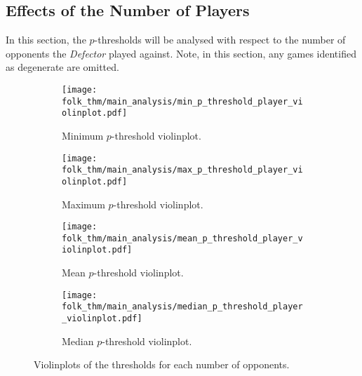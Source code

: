 \subsection{Effects of the Number of Players}\label{subsec:Effects_of_the_number_of_Players}
In this section, the \(p\)-thresholds will be analysed with respect to the
number of opponents the \textit{Defector} played against. Note, in this section,
any games identified as degenerate are omitted.


\begin{figure}
    \centering
    \begin{subfigure}{0.45\textwidth}
        \centering
        \texttt{[image: folk\_thm/main\_analysis/min\_p\_threshold\_player\_violinplot.pdf]}
        \caption{Minimum \(p\)-threshold violinplot.}\label{subfig:min_thresh_player_violinplot}
    \end{subfigure}
    \hspace{3pt}
    \begin{subfigure}{0.45\textwidth}
        \centering
        \texttt{[image: folk\_thm/main\_analysis/max\_p\_threshold\_player\_violinplot.pdf]}
        \caption{Maximum \(p\)-threshold violinplot.}\label{subfig:max_thresh_player_violinplot}
    \end{subfigure}

    \vspace{5pt}

    \begin{subfigure}{0.45\textwidth}
        \centering
        \texttt{[image: folk\_thm/main\_analysis/mean\_p\_threshold\_player\_violinplot.pdf]}
        \caption{Mean \(p\)-threshold violinplot.}\label{subfig:mean_thresh_player_violinplot}        
    \end{subfigure}
    \hspace{3pt}
    \begin{subfigure}{0.45\textwidth}
        \centering
        \texttt{[image: folk\_thm/main\_analysis/median\_p\_threshold\_player\_violinplot.pdf]}
        \caption{Median \(p\)-threshold violinplot.}\label{subfig:median_thresh_player_violinplot}
    \end{subfigure}
    \caption{Violinplots of the thresholds for each number of opponents.}\label{fig:player_mean_thresh_violinplot}
\end{figure}

